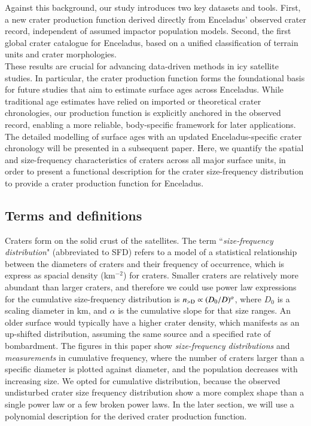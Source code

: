 \documentclass[preprint,11pt,3p,times,authoryear]{elsarticle}
\begin{document}
Against this background, our study introduces two key datasets and tools. First, a new crater production function derived directly from Enceladus’ observed crater record, independent of assumed impactor population models. Second, the first global crater catalogue for Enceladus, based on a unified classification of terrain units and crater morphologies. \\

These results are crucial for advancing data-driven methods in icy satellite studies. In particular, the crater production function forms the foundational basis for future studies that aim to estimate surface ages across Enceladus. While traditional age estimates have relied on imported or theoretical crater chronologies, our production function is explicitly anchored in the observed record, enabling a more reliable, body-specific framework for later applications. \\

The detailed modelling of surface ages with an updated Enceladus-specific crater chronology will be presented in a subsequent paper. Here, we quantify the spatial and size-frequency characteristics of craters across all major surface units, in order to present a functional description for the crater size-frequency distribution to provide a crater production function for Enceladus.

\subsection{Terms and definitions}
\label{term&def}
Craters form on the solid crust of the satellites. The term
``{\it size-frequency distribution}" (abbreviated to SFD) refers to a model of a statistical relationship between the diameters of craters and their frequency of occurrence, which is express as spacial density (km$^{-2}$) for craters.
Smaller craters are relatively more abundant than larger craters, and therefore we could use power law expressions for the cumulative size-frequency distribution is $n_{\rm >D} \propto (D_0/D)^\alpha$, %
where $D_0$ is a scaling diameter in km, and $\alpha$ is the cumulative slope for that size ranges.
An older surface would typically have a higher crater density, which manifests as an up-shifted distribution, assuming the same source and a specified rate of bombardment. 
The figures in this paper show {\it size-frequency distributions} and {\it measurements} in cumulative frequency, where the number of craters larger than a specific diameter is plotted against diameter, and the population decreases with increasing size. 
We opted for cumulative distribution, because the observed undisturbed crater size frequency distribution show a more complex shape than a single power law or a few broken power laws. In the later section, we will use a polynomial description for the derived crater production function.\\
\end{document}
